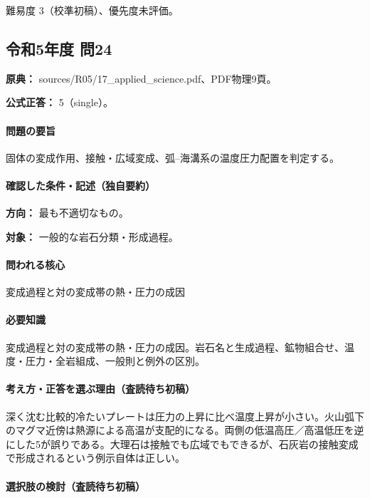\par 難易度 3（校準初稿）、優先度未評価。

\subsection{令和5年度 問24}
\label{q:r05-reg-applied-24}

\noindent\textbf{原典：} sources/R05/17\_applied\_science.pdf、PDF物理9頁。

\textbf{公式正答：} 5（single）。

\paragraph{問題の要旨} 固体の変成作用、接触・広域変成、弧–海溝系の温度圧力配置を判定する。

\paragraph{確認した条件・記述（独自要約）}\mbox{}\par

\noindent\textbf{方向：} 最も不適切なもの。\par

\noindent\textbf{対象：} 一般的な岩石分類・形成過程。\par

\paragraph{問われる核心} 変成過程と対の変成帯の熱・圧力の成因

\paragraph{必要知識} 変成過程と対の変成帯の熱・圧力の成因。岩石名と生成過程、鉱物組合せ、温度・圧力・全岩組成、一般則と例外の区別。

\paragraph{考え方・正答を選ぶ理由（査読待ち初稿）} 深く沈む比較的冷たいプレートは圧力の上昇に比べ温度上昇が小さい。火山弧下のマグマ近傍は熱源による高温が支配的になる。両側の低温高圧／高温低圧を逆にした5が誤りである。大理石は接触でも広域でもできるが、石灰岩の接触変成で形成されるという例示自体は正しい。

\paragraph{選択肢の検討（査読待ち初稿）}\mbox{}\par

